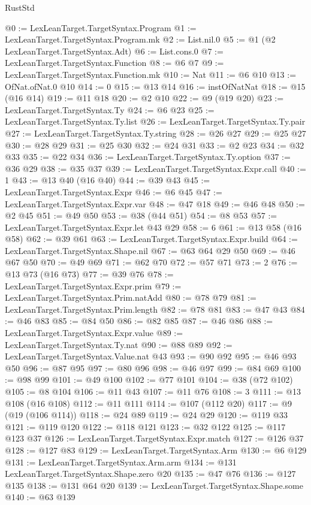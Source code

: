 \begin{lexlean}{RustStd}
\begin{coremodule}
{\begin{coremodule}
{{{{{{{{{{{{{{{{{{{{@0 := LexLeanTarget.TargetSyntax.Program
@1 := LexLeanTarget.TargetSyntax.Program.mk
@2 := List.nil.{0}
@5 := @1 (@2 LexLeanTarget.TargetSyntax.Adt)
@6 := List.cons.{0}
@7 := LexLeanTarget.TargetSyntax.Function
@8 := @6 @7
@9 := LexLeanTarget.TargetSyntax.Function.mk
@10 := Nat
@11 := @6 @10
@13 := OfNat.ofNat.{0} @10
@14 := 0
@15 := @13 @14
@16 := instOfNatNat
@18 := @15 (@16 @14)
@19 := @11 @18
@20 := @2 @10
@22 := @9 (@19 @20)
@23 := LexLeanTarget.TargetSyntax.Ty
@24 := @6 @23
@25 := LexLeanTarget.TargetSyntax.Ty.list
@26 := LexLeanTarget.TargetSyntax.Ty.pair
@27 := LexLeanTarget.TargetSyntax.Ty.string
@28 := @26 @27
@29 := @25 @27
@30 := @28 @29
@31 := @25 @30
@32 := @24 @31
@33 := @2 @23
@34 := @32 @33
@35 := @22 @34
@36 := LexLeanTarget.TargetSyntax.Ty.option
@37 := @36 @29
@38 := @35 @37
@39 := LexLeanTarget.TargetSyntax.Expr.call
@40 := 1
@43 := @13 @40 (@16 @40)
@44 := @39 @43
@45 := LexLeanTarget.TargetSyntax.Expr
@46 := @6 @45
@47 := LexLeanTarget.TargetSyntax.Expr.var
@48 := @47 @18
@49 := @46 @48
@50 := @2 @45
@51 := @49 @50
@53 := @38 (@44 @51)
@54 := @8 @53
@57 := LexLeanTarget.TargetSyntax.Expr.let @43 @29
@58 := 6
@61 := @13 @58 (@16 @58)
@62 := @39 @61
@63 := LexLeanTarget.TargetSyntax.Expr.build
@64 := LexLeanTarget.TargetSyntax.Shape.nil
@67 := @63 @64 @29 @50
@69 := @46 @67 @50
@70 := @49 @69
@71 := @62 @70
@72 := @57 @71
@73 := 2
@76 := @13 @73 (@16 @73)
@77 := @39 @76
@78 := LexLeanTarget.TargetSyntax.Expr.prim
@79 := LexLeanTarget.TargetSyntax.Prim.natAdd
@80 := @78 @79
@81 := LexLeanTarget.TargetSyntax.Prim.length
@82 := @78 @81
@83 := @47 @43
@84 := @46 @83
@85 := @84 @50
@86 := @82 @85
@87 := @46 @86
@88 := LexLeanTarget.TargetSyntax.Expr.value
@89 := LexLeanTarget.TargetSyntax.Ty.nat
@90 := @88 @89
@92 := LexLeanTarget.TargetSyntax.Value.nat @43
@93 := @90 @92
@95 := @46 @93 @50
@96 := @87 @95
@97 := @80 @96
@98 := @46 @97
@99 := @84 @69
@100 := @98 @99
@101 := @49 @100
@102 := @77 @101
@104 := @38 (@72 @102)
@105 := @8 @104
@106 := @11 @43
@107 := @11 @76
@108 := 3
@111 := @13 @108 (@16 @108)
@112 := @11 @111
@114 := @107 (@112 @20)
@117 := @9 (@19 (@106 @114))
@118 := @24 @89
@119 := @24 @29
@120 := @119 @33
@121 := @119 @120
@122 := @118 @121
@123 := @32 @122
@125 := @117 @123 @37
@126 := LexLeanTarget.TargetSyntax.Expr.match
@127 := @126 @37
@128 := @127 @83
@129 := LexLeanTarget.TargetSyntax.Arm
@130 := @6 @129
@131 := LexLeanTarget.TargetSyntax.Arm.arm
@134 := @131 LexLeanTarget.TargetSyntax.Shape.zero @20
@135 := @47 @76
@136 := @127 @135
@138 := @131 @64 @20
@139 := LexLeanTarget.TargetSyntax.Shape.some
@140 := @63 @139
}}}}}}}}}}}}}}}}}}}}
\end{coremodule}}
\end{coremodule}
\end{lexlean}
